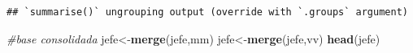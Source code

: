 \documentclass[
]{article}
\newenvironment{Shaded}{\begin{snugshade}}{\end{snugshade}}
\newcommand{\CommentTok}[1]{\textcolor[rgb]{0.56,0.35,0.01}{\textit{#1}}}
\newcommand{\DataTypeTok}[1]{\textcolor[rgb]{0.13,0.29,0.53}{#1}}
\newcommand{\DecValTok}[1]{\textcolor[rgb]{0.00,0.00,0.81}{#1}}
\newcommand{\KeywordTok}[1]{\textcolor[rgb]{0.13,0.29,0.53}{\textbf{#1}}}
\newcommand{\NormalTok}[1]{#1}
\newcommand{\OperatorTok}[1]{\textcolor[rgb]{0.81,0.36,0.00}{\textbf{#1}}}
\newcommand{\StringTok}[1]{\textcolor[rgb]{0.31,0.60,0.02}{#1}}
\begin{document}
\begin{Shaded}
\end{Shaded}

\begin{verbatim}
## `summarise()` ungrouping output (override with `.groups` argument)
\end{verbatim}

\begin{Shaded}
\begin{Highlighting}[]
\CommentTok{#base consolidada}
\NormalTok{jefe<-}\KeywordTok{merge}\NormalTok{(jefe,mm)}
\NormalTok{jefe<-}\KeywordTok{merge}\NormalTok{(jefe,vv)}
\KeywordTok{head}\NormalTok{(jefe)}
\end{Highlighting}
\end{Shaded}
\end{document}
